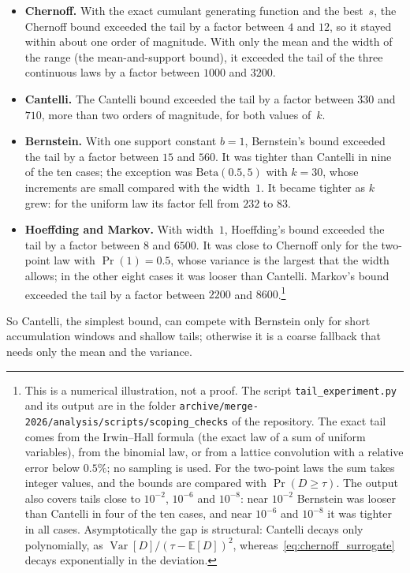 \documentclass[11pt,a4paper]{article}
\theoremstyle{plain}
\theoremstyle{definition}
\theoremstyle{remark}
\begin{document}
\begin{itemize}
  \item \textbf{Chernoff.} With the exact cumulant generating function and the best~$s$, the Chernoff bound exceeded the tail by a factor between $4$ and $12$, so it stayed within about one order of magnitude.
    With only the mean and the width of the range (the mean-and-support bound), it exceeded the tail of the three continuous laws by a factor between $1000$ and $3200$.
  \item \textbf{Cantelli.} The Cantelli bound exceeded the tail by a factor between $330$ and $710$, more than two orders of magnitude, for both values of~$k$.
  \item \textbf{Bernstein.} With one support constant $b = 1$, Bernstein's bound exceeded the tail by a factor between $15$ and $560$.
    It was tighter than Cantelli in nine of the ten cases; the exception was $\mathrm{Beta}(0.5,5)$ with $k = 30$, whose increments are small compared with the width~$1$.
    It became tighter as $k$ grew: for the uniform law its factor fell from $232$ to $83$.
  \item \textbf{Hoeffding and Markov.} With width~$1$, Hoeffding's bound exceeded the tail by a factor between $8$ and $6500$.
    It was close to Chernoff only for the two-point law with $\Pr(1) = 0.5$, whose variance is the largest that the width allows; in the other eight cases it was looser than Cantelli.
    Markov's bound exceeded the tail by a factor between $2200$ and $8600$.\footnote{This is a numerical illustration, not a proof.
    The script \texttt{tail\_experiment.py} and its output are in the folder \texttt{archive/merge-2026/analysis/scripts/\allowbreak scoping\_checks} of the repository.
    The exact tail comes from the Irwin--Hall formula (the exact law of a sum of uniform variables), from the binomial law, or from a lattice convolution with a relative error below $0.5\%$; no sampling is used.
    For the two-point laws the sum takes integer values, and the bounds are compared with $\Pr(D \ge \tau)$.
    The output also covers tails close to $10^{-2}$, $10^{-6}$ and $10^{-8}$: near $10^{-2}$ Bernstein was looser than Cantelli in four of the ten cases, and near $10^{-6}$ and $10^{-8}$ it was tighter in all cases.
    Asymptotically the gap is structural: Cantelli decays only polynomially, as $\operatorname{Var}[D]/(\tau-\mathbb{E}[D])^2$, whereas~\eqref{eq:chernoff_surrogate} decays exponentially in the deviation.}
\end{itemize}
So Cantelli, the simplest bound, can compete with Bernstein only for short accumulation windows and shallow tails; otherwise it is a coarse fallback that needs only the mean and the variance.
\end{document}
